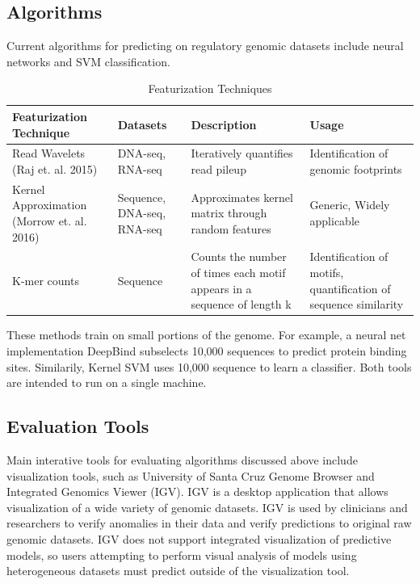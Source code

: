 \documentclass{sig-alternate-05-2015}
\begin{document}
\subsection{Algorithms}
Current algorithms for predicting on regulatory genomic datasets include neural networks and SVM classification. 
\begin{table}[t]
\centering
\caption{Featurization Techniques}
\label{my-label}
\begin{tabular}{| L{2cm} | L{1.45cm} | L{2cm} | L{1.75cm} |}
\hline
Featurization Technique & Datasets & Description & Usage
\\ \hline
Read Wavelets \newline 
(Raj et. al. 2015)           & DNA-seq, RNA-seq           & Iteratively quantifies read pileup                                 & Identification of genomic footprints \\ \hline 
Kernel Approximation  
(Morrow et. al. 2016) & Sequence, DNA-seq,  
RNA-seq & Approximates kernel matrix through random features & Generic, Widely applicable                                      \\ \hline
K-mer counts & Sequence & Counts the number of times each motif 
appears in a sequence of length k & Identification 
of motifs, quantification of sequence similarity \\ \hline
\end{tabular}
\end{table}
These methods train on small portions of the genome. For example, a neural net implementation DeepBind subselects 10,000 sequences to predict protein binding sites. Similarily, Kernel SVM uses 10,000 sequence to learn a classifier. Both tools are intended to run on a single machine. \\

\subsection{Evaluation Tools}
Main interative tools for evaluating algorithms discussed above include visualization tools, such as University of Santa Cruz Genome Browser and Integrated Genomics Viewer (IGV). IGV is a desktop application that allows visualization of a wide variety of genomic datasets. IGV is used by clinicians and researchers to verify anomalies in their data and verify predictions to original raw genomic datasets. IGV does not support integrated visualization of predictive models, so users attempting to perform visual analysis of models using heterogeneous datasets must predict outside of the visualization tool.
\end{document}
